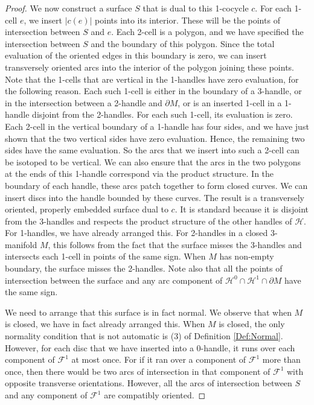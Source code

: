 \documentclass[oneside]{amsart}
\numberwithin{equation}{section}
\theoremstyle{plain}
\theoremstyle{definition}
\newcommand{\calH}{\mathcal{H}}
\newcommand{\calF}{\mathcal{F}}
\begin{document}
\begin{proof}
We now construct a surface $S$ that is dual to this 1-cocycle $c$. For each 1-cell $e$, we insert $|c(e)|$ points into its interior. These will be the points of intersection between $S$ and $e$. Each 2-cell is a polygon, and we have specified the intersection between $S$ and the boundary of this polygon. Since the total evaluation of the oriented edges in this boundary is zero, we can insert transversely oriented arcs into the interior of the polygon joining these points. Note that the 1-cells that are vertical in the 1-handles have zero evaluation, for the following reason. Each such 1-cell is either in the boundary of a 3-handle, or in the intersection between a 2-handle and $\partial M$, or is an inserted 1-cell in a 1-handle disjoint from the 2-handles. For each such 1-cell, its evaluation is zero. Each 2-cell in the vertical boundary of a 1-handle has four sides, and we have just shown that the two vertical sides have zero evaluation. Hence, the remaining two sides have the same evaluation. So the arcs that we insert into such a 2-cell can be isotoped to be vertical. We can also ensure that the arcs in the two polygons at the ends of this 1-handle correspond via the product structure. In the boundary of each handle, these arcs patch together to form closed curves. We can insert discs into the handle bounded by these curves. The result is a transversely oriented, properly embedded surface dual to $c$. It is standard because it is disjoint from the 3-handles and respects the product structure of the other handles of $\calH$. For 1-handles, we have already arranged this. For 2-handles in a closed 3-manifold $M$, this follows from the fact that the surface misses the 3-handles and intersects each 1-cell in points of the same sign. When $M$ has non-empty boundary, the surface misses the 2-handles. Note also that all the points of intersection between the surface and any arc component of $\calH^0 \cap \calH^1 \cap \partial M$ have the same sign.

We need to arrange that this surface is in fact normal. We observe that when $M$ is closed, we have in fact already arranged this. When $M$ is closed, the only normality condition that is not automatic is (3) of Definition \ref{Def:Normal}. However, for each disc that we have inserted into a 0-handle, it runs over each component of $\calF^1$ at most once. For if it ran over a component of $\calF^1$ more than once, then there would be two arcs of intersection in that component of $\calF^1$ with opposite transverse orientations. However, all the arcs of intersection between $S$ and any component of $\calF^1$ are compatibly oriented.


\end{proof}
\end{document}
